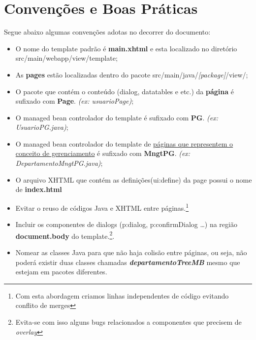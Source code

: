 \documentclass[a4paper,10pt]{article}
\begin{document}
\section{Convenções e Boas Práticas}
Segue abaixo algumas convenções adotas no decorrer do documento:
	\begin{itemize}
  		\item O nome do template padrão é \textbf{main.xhtml} e esta localizado no
  		diretório src/main/webapp/view/template;
  		\item As \textbf{pages} estão localizadas dentro do pacote
  		src/main/java/\emph{[package]}/view/;
  		\item O pacote que contém o conteúdo (dialog, datatables e etc.) da
  		\textbf{página} é sufixado com \textbf{Page}. \emph{(ex: usuarioPage)};
  		\item O managed bean controlador do template é sufixado com \textbf{PG}.
  		\emph{(ex:
  		UsuarioPG.java)};
  		\item O managed bean controlador do template de \underline{páginas que
  		representem o conceito de gerenciamento} é sufixado com \textbf{MngtPG}.
  		\emph{(ex:
  		DepartamentoMngtPG.java)};
	  	\item O arquivo XHTML que contém as definições(ui:define) da page possui o
  		nome de \textbf{index.html}
  		\item Evitar o reuso de códigos Java e XHTML entre páginas.\footnote{Com
  		esta abordagem criamos linhas independentes de código evitando conflito de
  		merges}
  		\item Incluir os componentes de dialogs (p:dialog, p:confirmDialog \ldots)
  		na região \textbf{document.body} do template.\footnote{Evita-se com isso
  		alguns bugs relacionados a componentes que precisem de \emph{overlay}}.
  		\item Nomear as classes Java para que não haja colisão entre páginas, ou
  		seja, não poderá existir duas classes chamadas
  		\textbf{\emph{departamentoTreeMB}} mesmo que estejam em pacotes diferentes.
	\end{itemize}

% 
%
\end{document}
